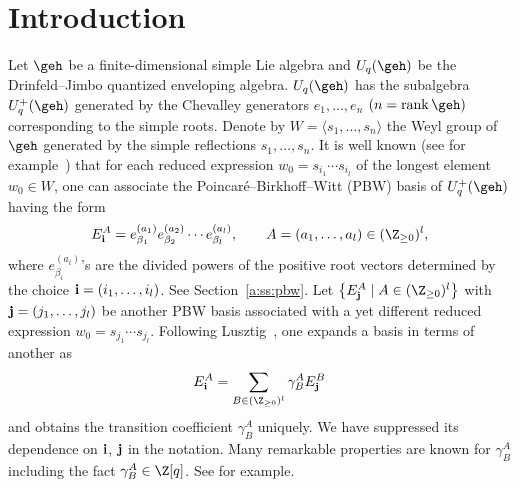 \section{Introduction}\label{a:sec1}

Let $\geh$ be a f\/inite-dimensional simple Lie algebra and
$U_q(\geh)$ be the Drinfeld--Jimbo quantized enveloping algebra.
$U_q(\geh)$ has the subalgebra $U^+_q(\geh)$ generated by the
Chevalley generators $e_1,\ldots, e_n$   $(n= \mathrm{rank}\, \geh)$
corresponding to the simple roots.
Denote by $W=\langle s_1,\ldots, s_n\rangle$ the
Weyl group of $\geh$ generated by the simple ref\/lections $s_1,\ldots, s_n$.
It is well known (see for example~\cite{L2}) that
for each reduced expression $w_0 = s_{i_1}\cdots s_{i_l}$
of the longest element $w_0 \in W$,
one can associate the Poincar\'e--Birkhof\/f--Witt (PBW) basis
of $U^+_q(\geh)$ having the form
\begin{gather*}
E_{\bf i}^A=e_{\beta_1}^{(a_1)}e_{\beta_2}^{(a_2)}\cdots e_{\beta_l}^{(a_l)},
\qquad
A=(a_1,\ldots, a_l) \in (\Z_{\ge 0})^l,
\end{gather*}
where $e^{(a_i)}_{\beta_i}$'s are the divided powers of the positive root
vectors determined by the choice ${\bf i}= (i_1,\ldots, i_l)$.
See Section~\ref{a:ss:pbw}.
Let $\big\{E^A_{\bf j}\mid A \in (\Z_{\ge 0})^l\big\}$ with
${\bf j} = (j_1,\ldots, j_l)$ be another
PBW basis associated with a yet dif\/ferent reduced expression
$w_0 = s_{j_1}\cdots s_{j_l}$.
Following Lusztig~\cite{L}, one expands
a basis in terms of another as
\begin{gather*}
E^A_{\bf i} = \sum_{B \in (\Z_{\ge 0})^l}
\gamma^A_B E^B_{\bf j}
\end{gather*}
and obtains the
transition coef\/f\/icient $\gamma^A_B$ uniquely.
We have suppressed its dependence on ${\bf i}$, ${\bf j}$
in the notation.
Many remarkable properties are known for $\gamma^A_B$
including the fact $\gamma^A_B \in \Z[q]$.
See \cite[Proposition~2.3]{L} for example.


